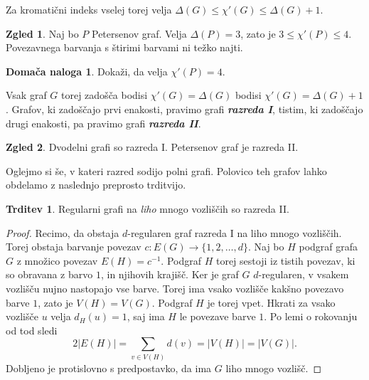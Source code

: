 \documentclass[11pt]{book}
\def\definicija{\color{rdeca}\bf\em}
\theoremstyle{definition}
\theoremstyle{zgled}
\newtheorem*{zgled}{Zgled}
\theoremstyle{odprtproblem}
\theoremstyle{domacanaloga}
\newtheorem*{domacanaloga}{Domača naloga}
\newenvironment{dokaz}
    {\color{siva}\begin{proof}}
    {\end{proof}}
\theoremstyle{izrek}
\newtheorem*{trditev}{Trditev}
\begin{document}
Za kromatični indeks vselej torej velja $\Delta(G) \leq \chi'(G) \leq \Delta(G) + 1$.

\begin{zgled}
Naj bo $P$ Petersenov graf. Velja $\Delta(P) = 3$, zato je $3 \leq \chi'(P) \leq 4$. Povezavnega barvanja s štirimi barvami ni težko najti.

\begin{domacanaloga}
Dokaži, da velja $\chi'(P) = 4$.
\end{domacanaloga}
\end{zgled}

Vsak graf $G$ torej zadošča bodisi $\chi'(G) = \Delta(G)$ bodisi $\chi'(G) = \Delta(G) + 1$. Grafov, ki zadoščajo prvi enakosti, pravimo grafi {\definicija razreda I}, tistim, ki zadoščajo drugi enakosti, pa pravimo grafi {\definicija razreda II}. 

\begin{zgled}
Dvodelni grafi so razreda I. Petersenov graf je razreda II.
\end{zgled}

Oglejmo si še, v kateri razred sodijo polni grafi. Polovico teh grafov lahko obdelamo z naslednjo preprosto trditvijo.

\begin{trditev}
Regularni grafi na \emph{liho} mnogo vozliščih so razreda II.
\end{trditev}
\begin{dokaz}
Recimo, da obstaja $d$-regularen graf razreda I na liho mnogo vozliščih. Torej obstaja barvanje povezav $c \colon E(G) \to \{ 1, 2, \dots, d \}$. Naj bo $H$ podgraf grafa $G$ z množico povezav $E(H) = c^{-1}$. Podgraf $H$ torej sestoji iz tistih povezav, ki so obravana z barvo $1$, in njihovih krajišč. Ker je graf $G$ $d$-regularen, v vsakem vozlišču nujno nastopajo vse barve. Torej ima vsako vozlišče kakšno povezavo barve $1$, zato je $V(H) = V(G)$. Podgraf $H$ je torej vpet. Hkrati za vsako vozlišče $u$ velja $d_H(u) = 1$, saj ima $H$ le povezave barve $1$. Po lemi o rokovanju od tod sledi
\[
2 |E(H)| = \sum_{v \in V(H)} d(v) = |V(H)| = |V(G)|.
\]
Dobljeno je protislovno s predpostavko, da ima $G$ liho mnogo vozlišč.
\end{dokaz}
\end{document}
